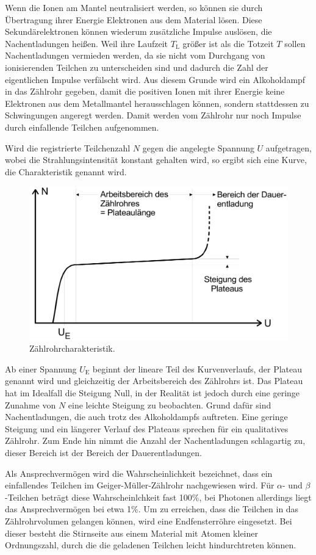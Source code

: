 Wenn die Ionen am Mantel neutralisiert werden, so können sie durch Übertragung ihrer Energie Elektronen aus dem Material lösen. Diese Sekundärelektronen können wiederum zusätzliche Impulse auslösen, die Nachentladungen heißen. Weil ihre Laufzeit $T_{\text{L}}$
größer ist als die Totzeit $T$ sollen Nachentladungen vermieden werden, da sie nicht vom Durchgang von ionisierenden Teilchen zu unterscheiden sind und dadurch die Zahl der eigentlichen Impulse verfälscht wird. Aus diesem Grunde wird ein Alkoholdampf in das
Zählrohr gegeben, damit die positiven Ionen mit ihrer Energie keine Elektronen aus dem Metallmantel herausschlagen können, sondern stattdessen zu Schwingungen angeregt werden. Damit werden vom Zählrohr nur noch Impulse durch einfallende Teilchen aufgenommen.

Wird die registrierte Teilchenzahl $N$ gegen die angelegte Spannung $U$ aufgetragen, wobei die Strahlungsintensität konstant gehalten wird, so ergibt sich eine Kurve, die Charakteristik genannt wird.
\begin{figure}[h!tbp]
	\centering
	\includegraphics[width=0.9\linewidth]{plateau.png}
	\caption{Zählrohrcharakteristik.\cite[5]{anleitung703}}
	\label{fig:plateau}
\end{figure}

Ab einer Spannung $U_{\text{E}}$ beginnt der lineare Teil des Kurvenverlaufs, der Plateau genannt wird und gleichzeitig der Arbeitsbereich des Zählrohrs ist. Das Plateau hat im Idealfall die Steigung Null, in der Realität ist jedoch durch eine geringe Zunahme 
von $N$ eine leichte Steigung zu beobachten. Grund dafür sind Nachentladungen, die auch trotz des Alkoholdampfs auftreten. Eine geringe Steigung und ein längerer Verlauf des Plateaus sprechen für ein qualitatives Zählrohr. Zum Ende hin nimmt die Anzahl der 
Nachentladungen schlagartig zu, dieser Bereich ist der Bereich der Dauerentladungen. 

Als Ansprechvermögen wird die Wahrscheinlichkeit bezeichnet, dass ein einfallendes Teilchen im Geiger-Müller-Zählrohr nachgewiesen wird. Für $\alpha$- und $\beta$-Teilchen beträgt diese Wahrscheinlchkeit fast 100\%, bei Photonen allerdings liegt das
Ansprechvermögen bei etwa 1\%. Um zu erreichen, dass die Teilchen in das Zählrohrvolumen gelangen können, wird eine Endfensterröhre eingesetzt. Bei dieser besteht die Stirnseite aus einem Material mit Atomen kleiner Ordnungszahl, durch die die geladenen Teilchen 
leicht hindurchtreten können. 